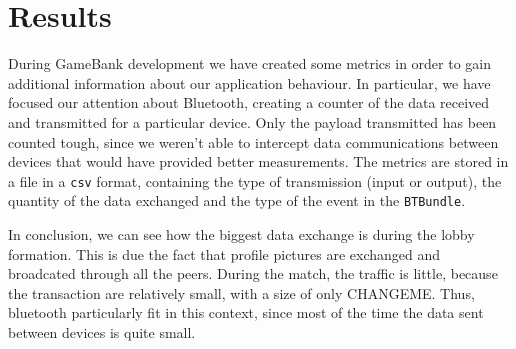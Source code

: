 \section{Results}

During GameBank development we have created some metrics in order to gain 
additional information about our application behaviour. In particular, we 
have focused our attention about Bluetooth, creating a counter of the data 
received and transmitted for a particular device. Only the payload transmitted 
has been counted tough, since we weren't able to intercept data communications 
between devices that would have provided better measurements. The metrics are 
stored in a file in a \texttt{csv} format, containing the type of transmission 
(input or output), the quantity of the data exchanged and the type of the 
event in the \texttt{BTBundle}.


In conclusion, we can see how the biggest data exchange is during the lobby 
formation. This is due the fact that profile pictures are exchanged and 
broadcated through all the peers. During the match, the traffic is little, 
because the transaction are relatively small, with a size of only 
CHANGEME. Thus, bluetooth particularly 
fit in this context, since most of the time the data sent between devices is 
quite small.
